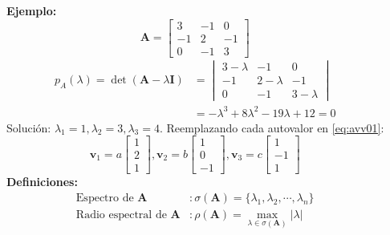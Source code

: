 \documentclass[9pt, aspectratio=169]{beamer}
\begin{document}
\begin{frame}
\begin{columns}[t]
		\cx
		\textbf{Ejemplo:}
		\[ \bm{A} = \begin{bmatrix}
				3  & -1 & 0  \\
				-1 & 2  & -1 \\
				0  & -1 & 3
			\end{bmatrix} \]
		\begin{align*}
			p_A(\lambda) =  \det(\bm{A} - \lambda \bm{I}) & =
			\begin{vmatrix}
				3 - \lambda & -1          & 0           \\
				-1          & 2 - \lambda & -1          \\
				0           & -1          & 3 - \lambda
			\end{vmatrix}                                                        \\
			                                              & = -\lambda^3 +8 \lambda^2 - 19 \lambda + 12 = 0
		\end{align*}
		Solución: $\lambda_1 = 1, \lambda_2 = 3, \lambda_3 = 4$. Reemplazando cada autovalor en \eqref{eq:avv01}:
		\[ \bm{v}_1 = a \begin{bmatrix} 1 \\ 2 \\ 1 \end{bmatrix},
			\bm{v}_2 = b \begin{bmatrix} 1 \\ 0 \\ -1 \end{bmatrix},
			\bm{v}_3 = c \begin{bmatrix} 1 \\ -1 \\ 1 \end{bmatrix} \]
		\pause
		\textbf{Definiciones:}
		\begin{equation*}
			\begin{split}
				\text{Espectro de } \bm{A}        & : \sigma(\bm{A}) = \{\lambda_1, \lambda_2, \cdots, \lambda_n \} \\
				\text{Radio espectral de } \bm{A} & : \rho(\bm{A}) = \max_{\lambda \in \sigma(\bm{A})}|\lambda|
			\end{split}
		\end{equation*}
	\end{columns}
\end{frame}
\end{document}
